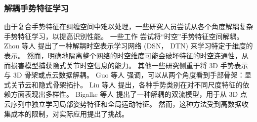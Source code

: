 

\subsubsection{解耦手势特征学习}
由于复合手势特征在纠缠空间\cite{zhou2023unified,LI2024110536}中难以处理，一些研究人员尝试从各个角度解耦复杂手势特征学习，以提高识别性能。
一些工作\cite{zhou2022decoupling,LI2024110536} 尝试将“时空”手势特征空间解耦。
Zhou 等人 \cite{zhou2023unified} 提出了一种解耦时空表示学习网络 (DSN， DTN) 来学习特定于维度的表示。
然而，明确地隔离整个网络的时空维度可能会破坏特征的时空连通性，从而损害模型捕获隐式关节时空信息的能力。
其他一些研究侧重于将 3D 手势表示与 3D 骨架或点云数据解耦。
Guo 等人 \cite{GUO2021108044} 强调，可以从两个角度看到手部骨架：显式关节云和隐式骨架拓扑。
Liu 等人\cite{liu2020decoupled} 提出，各种手势类别在对不同尺度特征的依赖方面表现出多样性。
Bigalke 等人 \cite{bigalke2021fusing} 提出了一种解耦的双流模型，用于从 3D 点云序列中独立学习局部姿势特征和全局运动特征。
然而，这种方法受到高数据收集成本的限制，对实际应用提出了挑战。

